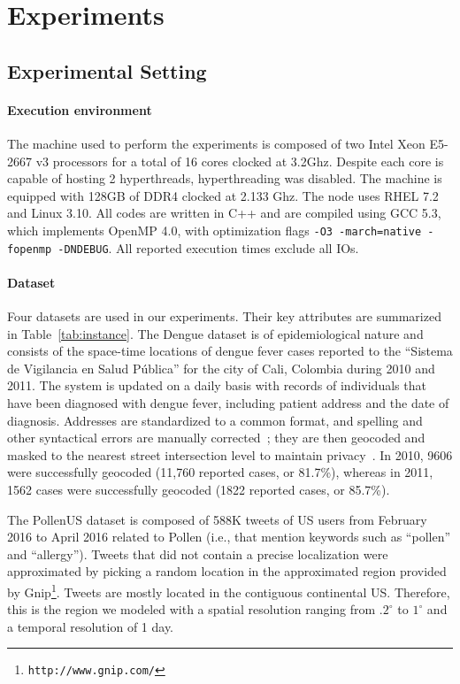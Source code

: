 \documentclass[10pt, conference, compsocconf]{IEEEtran}
\begin{document}
\section{Experiments}

\label{sec:experiments}

\subsection{Experimental Setting}

\paragraph{Execution environment} The machine used to perform the experiments is
composed of two Intel Xeon E5-2667 v3 processors for a total of
16 cores clocked at 3.2Ghz. Despite each core is capable of hosting 2
hyperthreads, hyperthreading was disabled. The machine is equipped with
128GB of DDR4 clocked at 2.133 Ghz. The node uses RHEL 7.2
and Linux 3.10. All codes are written in C++ and are compiled using GCC 5.3, which implements
OpenMP 4.0, with optimization flags \texttt{-O3 -march=native -fopenmp
  -DNDEBUG}. All reported execution times exclude all IOs.

\paragraph{Dataset} Four datasets are used in our experiments. Their
key attributes are summarized in Table~\ref{tab:instance}. 
The Dengue dataset is of epidemiological nature and consists of the space-time
locations of dengue fever cases reported to the “Sistema de Vigilancia
en Salud P\'{u}blica” for the city of Cali, Colombia during 2010 and 2011. The
system is updated on a daily basis with records of individuals that
have been diagnosed with dengue fever, including patient address and
the date of diagnosis. Addresses are standardized to a common 
format, and spelling and other syntactical errors are manually
corrected~\cite{delmelle2013spatio}; they are then geocoded and masked
to the nearest street intersection level to maintain
privacy~\cite{Kwan04}. In 2010, 9606 were successfully geocoded
(11,760 reported cases, or 81.7\%), whereas in 2011, 1562 cases were
successfully geocoded (1822 reported cases, or 85.7\%).

The PollenUS dataset is composed of 588K tweets of US users from
February 2016 to April 2016 related to Pollen (i.e., that mention
keywords such as ``pollen'' and ``allergy''). Tweets that did not
contain a precise localization were approximated by picking a random
location in the approximated region provided by
Gnip\footnote{\texttt{http://www.gnip.com/}}. Tweets are mostly located
in the contiguous continental US. Therefore, this is the region we
modeled with a spatial resolution ranging from $.2^\circ$ to $1^\circ$
and a temporal resolution of 1 day.
\end{document}
